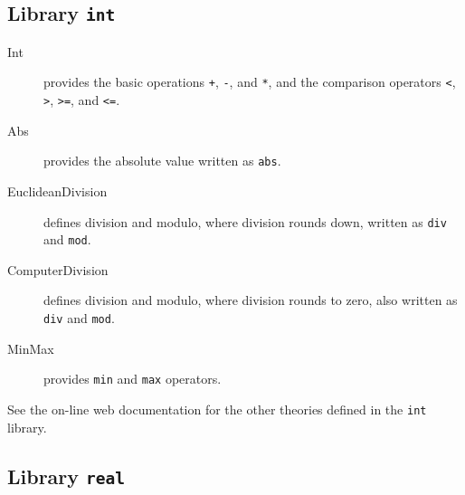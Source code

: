 \subsection{Library \texttt{int}}

\begin{description}

\item[Int] provides the basic operations \verb|+|, \verb|-|, and
  \verb|*|, and the comparison operators \verb|<|, \verb|>|, \verb|>=|, and
  \verb|<=|.

\item[Abs] provides the absolute value written as \verb|abs|.

\item[EuclideanDivision] defines division and modulo, where division rounds
  down, written as \verb|div| and \verb|mod|.

\item[ComputerDivision] defines division and modulo, where division rounds to
  zero, also written as \verb|div| and \verb|mod|.

\item[MinMax] provides \verb|min| and \verb|max| operators.

\end{description}

See the on-line web documentation for the other theories defined in the
\texttt{int} library.

\subsection{Library \texttt{real}}

